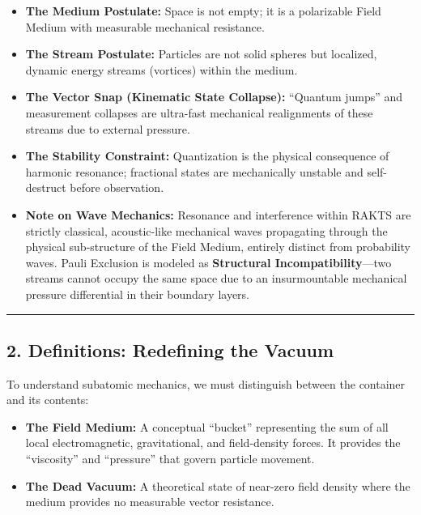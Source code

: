 \documentclass[twocolumn]{article}
\providecommand{\tightlist}{%
  \setlength{\itemsep}{0pt}\setlength{\parskip}{0pt}}
\begin{document}
\begin{itemize}
\tightlist
\item
  \textbf{The Medium Postulate:} Space is not empty; it is a polarizable
  Field Medium with measurable mechanical resistance.
\item
  \textbf{The Stream Postulate:} Particles are not solid spheres but
  localized, dynamic energy streams (vortices) within the medium.
\item
  \textbf{The Vector Snap (Kinematic State Collapse):} ``Quantum jumps''
  and measurement collapses are ultra-fast mechanical realignments of
  these streams due to external pressure.
\item
  \textbf{The Stability Constraint:} Quantization is the physical
  consequence of harmonic resonance; fractional states are mechanically
  unstable and self-destruct before observation.
\item
  \textbf{Note on Wave Mechanics:} Resonance and interference within
  RAKTS are strictly classical, acoustic-like mechanical waves
  propagating through the physical sub-structure of the Field Medium,
  entirely distinct from probability waves. Pauli Exclusion is modeled
  as \textbf{Structural Incompatibility}---two streams cannot occupy the
  same space due to an insurmountable mechanical pressure differential
  in their boundary layers.
\end{itemize}

\begin{center}\rule{0.5\linewidth}{0.5pt}\end{center}

\subsection{2. Definitions: Redefining the
Vacuum}\label{definitions-redefining-the-vacuum}

To understand subatomic mechanics, we must distinguish between the
container and its contents:

\begin{itemize}
\tightlist
\item
  \textbf{The Field Medium:} A conceptual ``bucket'' representing the
  sum of all local electromagnetic, gravitational, and field-density
  forces. It provides the ``viscosity'' and ``pressure'' that govern
  particle movement.
\item
  \textbf{The Dead Vacuum:} A theoretical state of near-zero field
  density where the medium provides no measurable vector resistance.
\end{itemize}
\end{document}
